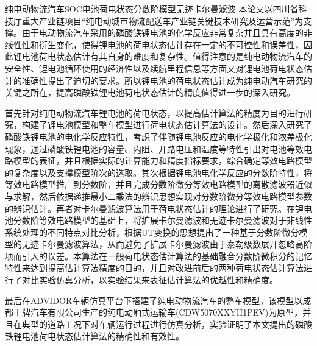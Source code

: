 
\begin{Cabstract}{纯电动物流汽车}{SOC}{电池荷电状态}{分数阶模型}{无迹卡尔曼滤波}
本论文以四川省科技厅重大产业链项目“纯电动城市物流配送车产业链关键技术研究及运营示范”为支撑。由于电动物流汽车采用的磷酸铁锂电池的化学反应非常复杂并且具有高度的非线性性和衍生变化，使得锂电池的荷电状态估计存在一定的不可控性和误差性，因此锂电池荷电状态估计有其自身的难度和复杂性。值得注意的是纯电动物流汽车的安全性、锂电池循环使用的经济性以及续航里程信息等方面又对锂电池荷电状态估计的准确性提出了迫切的要求。所以锂电池的荷电状态估计成为纯电动汽车研究的关键之所在，提高磷酸铁锂电池荷电状态估计的精度值得进一步的深入研究。

首先针对纯电动物流汽车锂电池的荷电状态，以提高估计算法的精度为目的进行研究，构建了锂电池模型和整车模型进行荷电状态估计算法的设计。然后深入研究了磷酸铁锂电池的电化学反应特性，考虑了伴随锂电池反应的电化学极化和浓差极化现象，通过磷酸铁锂电池的容量、内阻、开路电压和温度等特性引出对电池等效电路模型的表征，并且根据实际的计算能力和精度指标要求，综合确定等效电路模型的复杂度以及支撑模型阶次的选取。其次根据锂电池电化学反应的分数阶特性，将等效电路模型推广到分数阶，并且完成分数阶微分等效电路模型的离散滤波器近似与求解，然后依据递推最小二乘法的辨识思想实现对分数阶微分等效电路模型参数的辨识估计。再者对卡尔曼滤波算法用于荷电状态估计的理论进行了研究。在锂电池分数阶等效电路模型的基础上，将扩展卡尔曼滤波和无迹卡尔曼滤波对于非线性系统处理的不同特点对比分析，根据UT变换的思想提出了一种基于分数阶微分模型的无迹卡尔曼滤波算法，从而避免了扩展卡尔曼滤波由于泰勒级数展开忽略高阶项而引入的误差。本算法在一般荷电状态估计算法的基础融合分数阶微积分的记忆特性来达到提高估计算法精度的目的，并且对改进前后的两种荷电状态估计算法进行了对比实验仿真分析，以实验结果来表征估计算法的优越性和精确度。

	最后在ADVIDOR车辆仿真平台下搭建了纯电动物流汽车的整车模型，该模型以成都王牌汽车有限公司生产的纯电动厢式运输车(CDW5070XXYH1PEV)为原型，并且在典型的道路工况下对车辆运行过程进行仿真分析，实验证明了本文提出的磷酸铁锂电池荷电状态估计算法的精确性和有效性。
\end{Cabstract}
